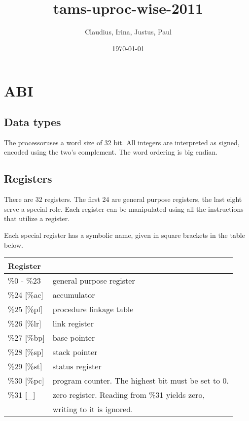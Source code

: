 \documentclass{article}
\author{Claudius, Irina, Justus, Paul}
\title{\cpu\\
tams-uproc-wise-2011}
\date{\today}
\newcommand{\cpu}{processor}
\begin{document}
\maketitle
\tableofcontents

\section{ABI}

\subsection{Data types}

The \cpu uses a word size of 32 bit. All integers are interpreted as
signed, encoded using the two's complement. The word ordering is big
endian.

\subsection{Registers}

There are 32 registers. The first 24 are general purpose registers,
the last eight serve a special role. Each register can be manipulated
using all the instructions that utilize a register.

Each special register has a symbolic name, given in square brackets in
the table below.

\begin{center}
  \begin{tabular}{l|l}
    Register & \\
    \hline
    \%0 - \%23   & general purpose register \\
    \%24 [\%ac]  & accumulator \\
    \%25 [\%pl]  & procedure linkage table \\
    \%26 [\%lr]  & link register \\
    \%27 [\%bp]  & base pointer \\
    \%28 [\%sp]  & stack pointer \\
    \%29 [\%st]  & status register \\
    \%30 [\%pc]  & program counter. The highest bit must be set to 0. \\
    \%31 [\_]    & zero register. Reading from \%31 yields zero, \\
                 & writing to it is ignored. \\
  \end{tabular}
\end{center}
\end{document}
